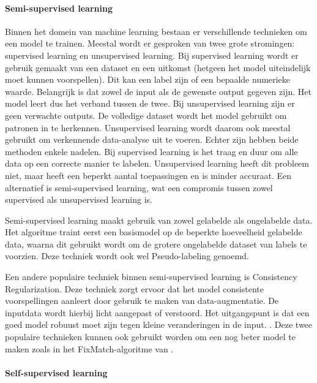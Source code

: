 \paragraph{Semi-supervised learning}

Binnen het domein van machine learning bestaan er verschillende technieken om een model te trainen. Meestal wordt er gesproken van twee grote stromingen: supervised learning en unsupervised learning. Bij supervised learning wordt er gebruik gemaakt van een dataset en een uitkomst (hetgeen het model uiteindelijk moet kunnen voorspellen). Dit kan een label zijn of een bepaalde numerieke waarde. Belangrijk is dat zowel de input als de gewenste output gegeven zijn. Het model leert dus het verband tussen de twee. Bij unsupervised learning zijn er geen verwachte outputs. De volledige dataset wordt het model gebruikt om patronen in te herkennen. Unsupervised learning wordt daarom ook meestal gebruikt om verkennende data-analyse uit te voeren. Echter zijn hebben beide methoden enkele nadelen. Bij supervised learning is het traag en duur om alle data op een correcte manier te labelen. Unsupervised learning heeft dit probleem niet, maar heeft een beperkt aantal toepassingen en is minder accuraat. Een alternatief is semi-supervised learning, wat een compromis tussen zowel supervised als unsupervised learning is. \autocite{C_A_Padmanabha_Reddy_2018}

Semi-supervised learning maakt gebruik van zowel gelabelde als ongelabelde data. Het algoritme traint eerst een basismodel op de beperkte hoeveelheid gelabelde data, waarna dit gebruikt wordt om de grotere ongelabelde dataset van labels te voorzien. Deze techniek wordt ook wel Pseudo-labeling genoemd. \autocite{Lee_2013}

Een andere populaire techniek binnen semi-supervised learning is Consistency Regularization. Deze techniek zorgt ervoor dat het model consistente voorspellingen aanleert door gebruik te maken van data-augmentatie. De inputdata wordt hierbij licht aangepast of verstoord. Het uitgangspunt is dat een goed model robuust moet zijn tegen kleine veranderingen in de input. \autocite{Fan_2022}.
Deze twee populaire technieken kunnen ook gebruikt worden om een nog beter model te maken zoals in het FixMatch-algoritme van \textcite{Sohn_2020}.

\paragraph{Self-supervised learning}

